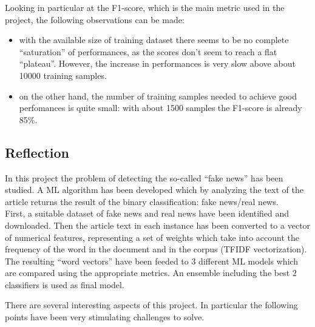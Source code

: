 \documentclass[a4paper,12pt]{article} %
\begin{document}
Looking in particular at the F1-score, which is the main metric used in the project,
the following observations can be made:
\begin{itemize}
    \item with the available size of training dataset there seems to be no complete ``saturation'' of performances,
    as the scores don't seem to reach a flat ``plateau''.
    However, the increase in performances is very slow above about 10000 training samples.
    \item on the other hand, the number of training samples needed to achieve good perfomances is quite small:
    with about 1500 samples the F1-score is already 85\%.
\end{itemize}

\subsection{Reflection}
\label{sec:reflection}
In this project the problem of detecting the so-called ``fake news'' has been studied.
A ML algorithm has been developed which by analyzing the text of the article
returns the result of the binary classification: fake news/real news. \\
First, a suitable dataset of fake news and real news have been identified and downloaded.
Then the article text in each instance has been converted to a vector of numerical features,
representing a set of weights which take into account the frequency of the word in the document and
in the corpus (TFIDF vectorization).
The resulting ``word vectors'' have been feeded to 3 different ML models which are
compared using the appropriate metrics.
An ensemble including the best 2 classifiers is used as final model.

There are several interesting aspects of this project.
In particular the following points have been very stimulating challenges to solve.
\end{document}
